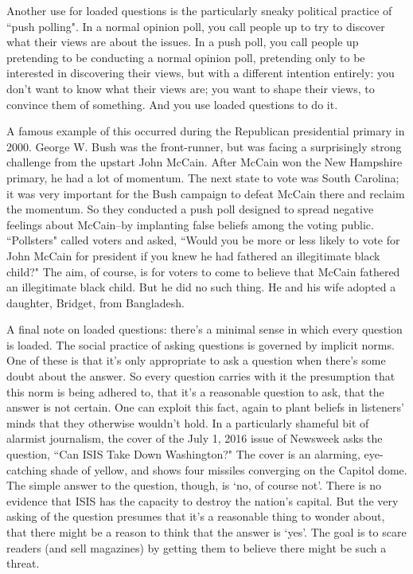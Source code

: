 Another use for loaded questions is the particularly sneaky political practice of ``push polling". In
a normal opinion poll, you call people up to try to discover what their views are about the issues.
In a push poll, you call people up pretending to be conducting a normal opinion poll, pretending
only to be interested in discovering their views, but with a different intention entirely: you don't
want to know what their views are; you want to shape their views, to convince them of something.
And you use loaded questions to do it.

A famous example of this occurred during the Republican presidential primary in 2000. George
W. Bush was the front-runner, but was facing a surprisingly strong challenge from the upstart John
McCain. After McCain won the New Hampshire primary, he had a lot of momentum. The next
state to vote was South Carolina; it was very important for the Bush campaign to defeat McCain
there and reclaim the momentum. So they conducted a push poll designed to spread negative
feelings about McCain--by implanting false beliefs among the voting public. ``Pollsters" called
voters and asked, ``Would you be more or less likely to vote for John McCain for president if you
knew he had fathered an illegitimate black child?" The aim, of course, is for voters to come to
believe that McCain fathered an illegitimate black child. But he did no such thing. He and his
wife adopted a daughter, Bridget, from Bangladesh.

A final note on loaded questions: there's a minimal sense in which every question is loaded. The
social practice of asking questions is governed by implicit norms. One of these is that it's only
appropriate to ask a question when there's some doubt about the answer. So every question carries
with it the presumption that this norm is being adhered to, that it's a reasonable question to ask,
that the answer is not certain. One can exploit this fact, again to plant beliefs in listeners' minds
that they otherwise wouldn't hold. In a particularly shameful bit of alarmist journalism, the cover
of the July 1, 2016 issue of Newsweek asks the question, ``Can ISIS Take Down Washington?" The
cover is an alarming, eye-catching shade of yellow, and shows four missiles converging on the
Capitol dome. The simple answer to the question, though, is `no, of course not'. There is no
evidence that ISIS has the capacity to destroy the nation's capital. But the very asking of the
question presumes that it's a reasonable thing to wonder about, that there might be a reason to
think that the answer is `yes'. The goal is to scare readers (and sell magazines) by getting them to
believe there might be such a threat.

